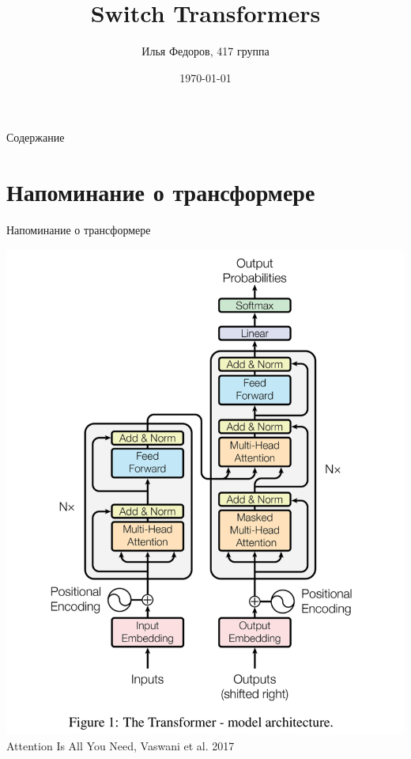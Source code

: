 \documentclass[aspectratio=169,xcolor=dvipsnames]{beamer}
\title[short title]{Switch Transformers}
\author[Pin-Yen] {Илья Федоров, 417 группа}
\institute[NTU] %
{
    Факультет вычислительной математики и кибернетики \\
    МГУ им. М.В.Ломоносова
    \vskip 3pt
}
\date{\today} %
\begin{document}
\begin{frame}
    \titlepage
\end{frame}

\begin{frame}{Содержание}
    \tableofcontents
\end{frame}

\section{Напоминание о трансформере}


\begin{frame}{Напоминание о трансформере}
\begin{center}
\includegraphics[scale=0.1]{trans.png}
Attention Is All You Need, Vaswani et al. 2017
\end{center}

\end{frame}
\end{document}
